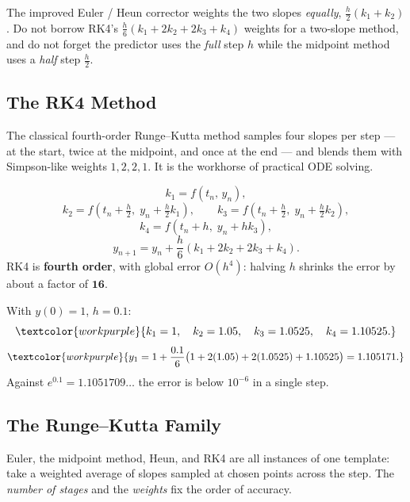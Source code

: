 \begin{warningbox}
The improved Euler / Heun corrector weights the two slopes \emph{equally},
$\tfrac{h}{2}(k_1+k_2)$. Do not borrow RK4's $\tfrac{h}{6}(k_1+2k_2+2k_3+k_4)$
weights for a two-slope method, and do not forget the predictor uses the
\emph{full} step $h$ while the midpoint method uses a \emph{half} step
$\tfrac{h}{2}$.
\end{warningbox}

\subsection{The RK4 Method}

The classical fourth-order Runge--Kutta method samples four slopes per step --- at
the start, twice at the midpoint, and once at the end --- and blends them with
Simpson-like weights $1,2,2,1$. It is the workhorse of practical ODE solving.

\begin{formulabox}
\[ k_1 = f(t_n,\,y_n), \]
\[ k_2 = f\!\left(t_n+\tfrac{h}{2},\; y_n+\tfrac{h}{2}k_1\right), \qquad
   k_3 = f\!\left(t_n+\tfrac{h}{2},\; y_n+\tfrac{h}{2}k_2\right), \]
\[ k_4 = f\!\left(t_n+h,\; y_n+h k_3\right), \]
\[ y_{n+1} = y_n + \frac{h}{6}\left(k_1 + 2k_2 + 2k_3 + k_4\right). \]
RK4 is \textbf{fourth order}, with global error $O(h^{4})$: halving $h$ shrinks the
error by about a factor of $\mathbf{16}$.
\end{formulabox}

\begin{examplebox}[Worked Example 5.4: One RK4 step for $y'=y$]
With $y(0)=1$, $h=0.1$:
\[ \textcolor{workpurple}{k_1 = 1,\quad k_2 = 1.05,\quad k_3 = 1.0525,\quad k_4 = 1.10525.} \]
\[ \textcolor{workpurple}{y_1 = 1 + \frac{0.1}{6}\big(1 + 2(1.05) + 2(1.0525) + 1.10525\big) = 1.105171.} \]
Against $e^{0.1}=1.1051709\ldots$ the error is below $10^{-6}$ in a single step.
\end{examplebox}

\subsection{The Runge--Kutta Family}

Euler, the midpoint method, Heun, and RK4 are all instances of one template: take
a weighted average of slopes sampled at chosen points across the step. The
\emph{number of stages} and the \emph{weights} fix the order of accuracy.

